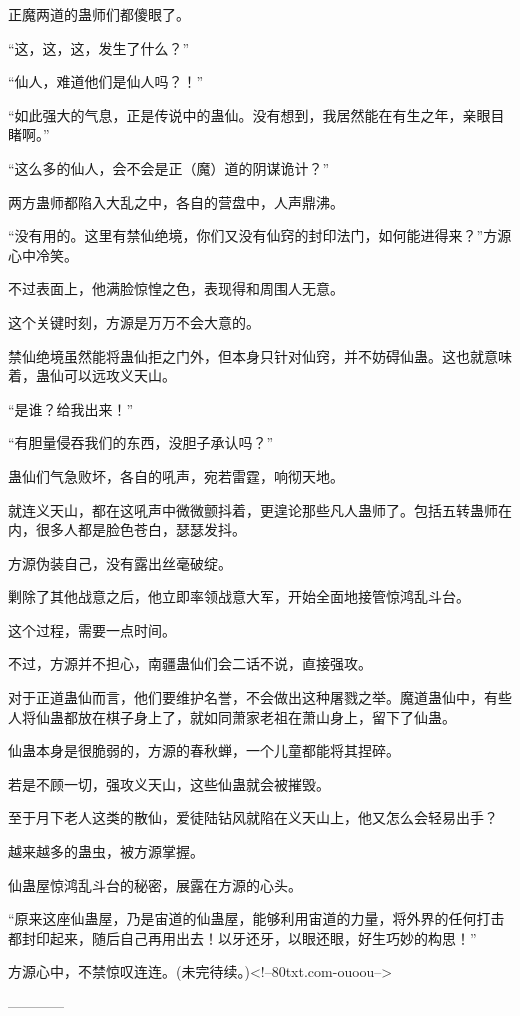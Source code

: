 \begin{this_body}
正魔两道的蛊师们都傻眼了。

“这，这，这，发生了什么？”

“仙人，难道他们是仙人吗？！”

“如此强大的气息，正是传说中的蛊仙。没有想到，我居然能在有生之年，亲眼目睹啊。”

“这么多的仙人，会不会是正（魔）道的阴谋诡计？”

两方蛊师都陷入大乱之中，各自的营盘中，人声鼎沸。

“没有用的。这里有禁仙绝境，你们又没有仙窍的封印法门，如何能进得来？”方源心中冷笑。

不过表面上，他满脸惊惶之色，表现得和周围人无意。

这个关键时刻，方源是万万不会大意的。

禁仙绝境虽然能将蛊仙拒之门外，但本身只针对仙窍，并不妨碍仙蛊。这也就意味着，蛊仙可以远攻义天山。

“是谁？给我出来！”

“有胆量侵吞我们的东西，没胆子承认吗？”

蛊仙们气急败坏，各自的吼声，宛若雷霆，响彻天地。

就连义天山，都在这吼声中微微颤抖着，更遑论那些凡人蛊师了。包括五转蛊师在内，很多人都是脸色苍白，瑟瑟发抖。

方源伪装自己，没有露出丝毫破绽。

剿除了其他战意之后，他立即率领战意大军，开始全面地接管惊鸿乱斗台。

这个过程，需要一点时间。

不过，方源并不担心，南疆蛊仙们会二话不说，直接强攻。

对于正道蛊仙而言，他们要维护名誉，不会做出这种屠戮之举。魔道蛊仙中，有些人将仙蛊都放在棋子身上了，就如同萧家老祖在萧山身上，留下了仙蛊。

仙蛊本身是很脆弱的，方源的春秋蝉，一个儿童都能将其捏碎。

若是不顾一切，强攻义天山，这些仙蛊就会被摧毁。

至于月下老人这类的散仙，爱徒陆钻风就陷在义天山上，他又怎么会轻易出手？

越来越多的蛊虫，被方源掌握。

仙蛊屋惊鸿乱斗台的秘密，展露在方源的心头。

“原来这座仙蛊屋，乃是宙道的仙蛊屋，能够利用宙道的力量，将外界的任何打击都封印起来，随后自己再用出去！以牙还牙，以眼还眼，好生巧妙的构思！”

方源心中，不禁惊叹连连。(未完待续。)<!--80txt.com-ouoou-->

------------

\end{this_body}

